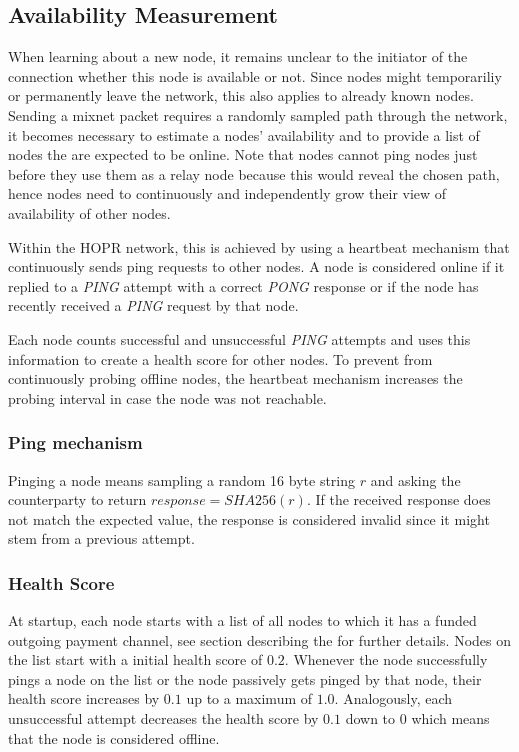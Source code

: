 \subsection{Availability Measurement}
\label{sec:p2p:availability}

When learning about a new node, it remains unclear to the initiator of the connection whether this node is available or not. Since nodes might temporariliy or permanently leave the network, this also applies to already known nodes. Sending a mixnet packet requires a randomly sampled path through the network, it becomes necessary to estimate a nodes' availability and to provide a list of nodes the are expected to be online. Note that nodes cannot ping nodes just before they use them as a relay node because this would reveal the chosen path, hence nodes need to continuously and independently grow their view of availability of other nodes.

Within the HOPR network, this is achieved by using a heartbeat mechanism that continuously sends ping requests to other nodes. A node is considered online if it replied to a \textit{PING} attempt with a correct \textit{PONG} response or if the node has recently received a \textit{PING} request by that node.

Each node counts successful and unsuccessful \textit{PING} attempts and uses this information to create a health score for other nodes. To prevent from continuously probing offline nodes, the heartbeat mechanism increases the probing interval in case the node was not reachable.

\subsubsection{Ping mechanism}
\label{sec:p2p:ping-mechanism}

Pinging a node means sampling a random 16 byte string $r$ and asking the counterparty to return $response = SHA256(r)$. If the received response does not match the expected value, the response is considered invalid since it might stem from a previous attempt.

\subsubsection{Health Score}
\label{sec:p2p:health-score}

At startup, each node starts with a list of all nodes to which it has a funded outgoing payment channel, see section describing the  for further details. Nodes on the list start with a initial health score of $0.2$. Whenever the node successfully pings a node on the list or the node passively gets pinged by that node, their health score increases by $0.1$ up to a maximum of $1.0$. Analogously, each unsuccessful attempt decreases the health score by $0.1$ down to $0$ which means that the node is considered offline.

